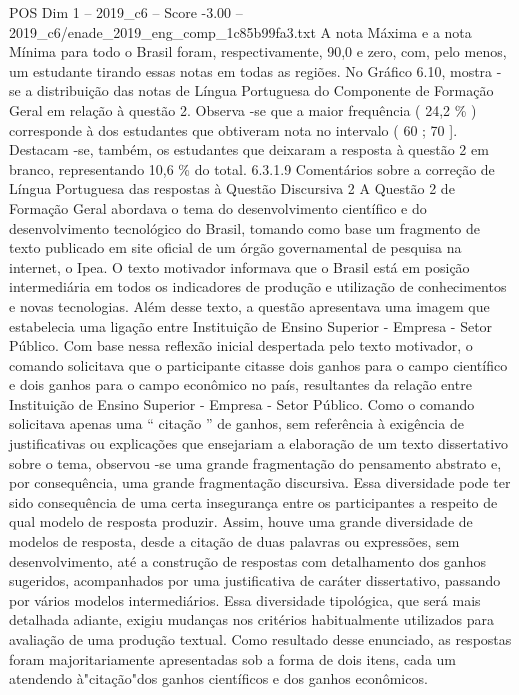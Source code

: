 \begin{textsample}{POS Dim 1 – 2019\_c6 – Score -3.00 – 2019\_c6/enade\_2019\_eng\_comp\_1c85b99fa3.txt}
A nota Máxima e a nota Mínima para todo o Brasil foram, respectivamente, 90,0 e zero, com, pelo menos, um estudante tirando essas notas em todas as regiões.
No Gráfico 6.10, mostra -se a distribuição das notas de Língua Portuguesa do Componente de Formação Geral em relação à questão 2.
Observa -se que a maior frequência ( 24,2 \% ) corresponde à dos estudantes que obtiveram nota no intervalo ( 60 ; 70 ].
Destacam -se, também, os estudantes que deixaram a resposta à questão 2 em branco, representando 10,6 \% do total. 6.3.1.9 Comentários sobre a correção de Língua Portuguesa das respostas à Questão Discursiva 2 A Questão 2 de Formação Geral abordava o tema do desenvolvimento científico e do desenvolvimento tecnológico do Brasil, tomando como base um fragmento de texto publicado em site oficial de um órgão governamental de pesquisa na internet, o Ipea.
O texto motivador informava que o Brasil está em posição intermediária em todos os indicadores de produção e utilização de conhecimentos e novas tecnologias.
Além desse texto, a questão apresentava uma imagem que estabelecia uma ligação entre Instituição de Ensino Superior - Empresa - Setor Público.
Com base nessa reflexão inicial despertada pelo texto motivador, o comando solicitava que o participante citasse dois ganhos para o campo científico e dois ganhos para o campo econômico no país, resultantes da relação entre Instituição de Ensino Superior - Empresa - Setor Público.
Como o comando solicitava apenas uma “ citação ” de ganhos, sem referência à exigência de justificativas ou explicações que ensejariam a elaboração de um texto dissertativo sobre o tema, observou -se uma grande fragmentação do pensamento abstrato e, por consequência, uma grande fragmentação discursiva.
Essa diversidade pode ter sido consequência de uma certa insegurança entre os participantes a respeito de qual modelo de resposta produzir.
Assim, houve uma grande diversidade de modelos de resposta, desde a citação de duas palavras ou expressões, sem desenvolvimento, até a construção de respostas com detalhamento dos ganhos sugeridos, acompanhados por uma justificativa de caráter dissertativo, passando por vários modelos intermediários.
Essa diversidade tipológica, que será mais detalhada adiante, exigiu mudanças nos critérios habitualmente utilizados para avaliação de uma produção textual.
Como resultado desse enunciado, as respostas foram majoritariamente apresentadas sob a forma de dois itens, cada um atendendo à"citação"dos ganhos científicos e dos ganhos econômicos.

\end{textsample}
